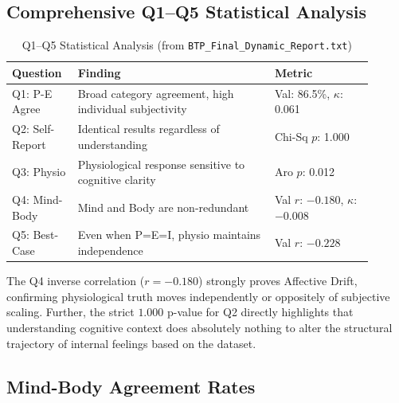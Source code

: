 \documentclass[11pt, a4paper]{report}
\begin{document}
\subsection{Comprehensive Q1--Q5 Statistical Analysis}

\begin{table}[H]
    \centering
    \small
    \caption{Q1--Q5 Statistical Analysis (from \texttt{BTP\_Final\_Dynamic\_Report.txt})}
    \label{tab:q1q5}
    \begin{tabular}{@{}p{0.15\linewidth}p{0.50\linewidth}p{0.25\linewidth}@{}}
        \toprule
        \textbf{Question} & \textbf{Finding} & \textbf{Metric} \\
        \midrule
        Q1: P-E Agree & Broad category agreement, high individual subjectivity & Val: 86.5\%, $\kappa$: 0.061 \\
        Q2: Self-Report & Identical results regardless of understanding & Chi-Sq $p$: 1.000 \\
        Q3: Physio & Physiological response sensitive to cognitive clarity & Aro $p$: 0.012 \\
        Q4: Mind-Body & Mind and Body are non-redundant & Val $r$: $-0.180$, $\kappa$: $-0.008$ \\
        Q5: Best-Case & Even when P=E=I, physio maintains independence & Val $r$: $-0.228$ \\
        \bottomrule
    \end{tabular}
\end{table}

The Q4 inverse correlation ($r = -0.180$) strongly proves Affective Drift, confirming physiological truth moves independently or oppositely of subjective scaling. Further, the strict $1.000$ p-value for Q2 directly highlights that understanding cognitive context does absolutely nothing to alter the structural trajectory of internal feelings based on the dataset.


\subsection{Mind-Body Agreement Rates}
\end{document}
